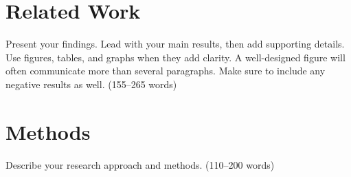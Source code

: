 \documentclass[midterm]{sparreport}
\begin{document}
\section{Related Work}

Present your findings. Lead with your main results, then add supporting details. Use figures, tables, and graphs when they add clarity. A well-designed figure will often communicate more than several paragraphs. Make sure to include any negative results as well. (155–265 words)


\section{Methods}

Describe your research approach and methods. (110–200 words)



\end{document}
